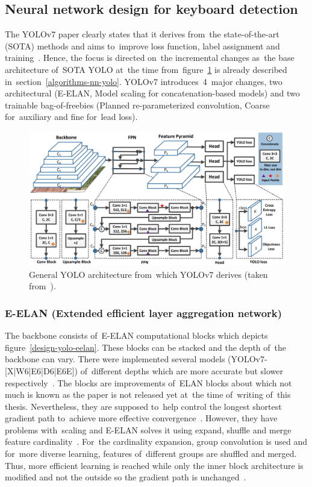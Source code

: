\subsection{Neural network design for keyboard detection}
\label{design-keyboard-neural-network}
The YOLOv7 paper clearly states that it derives from~the state-of-the-art (SOTA) \hbox{methods} and aims to~improve loss function, label assignment and training~\cite{yolov7}. Hence, the focus is directed on~the incremental changes as~the base architecture of~SOTA YOLO at~the time from~figure~\ref{design-yolo-architecture} is already described in~section~\ref{algorithms-nn-yolo}. YOLOv7 introduces~4~\hbox{major} changes, two architectural (E-ELAN, Model scaling for concatenation-based \hbox{models}) and two trainable bag-of-freebies (Planned re-parameterized convolution, Coarse for~\hbox{auxiliary} and fine for~lead loss).

\begin{figure}[hbt]
    \includegraphics[width=1\textwidth]{img/design/yolov7-architecture.png}
    \caption{General YOLO architecture from~which YOLOv7 derives (taken from~\cite{pp-yolo}).}
    \label{design-yolo-architecture}
\end{figure}

\subsubsection{E-ELAN (Extended efficient layer aggregation network)}
The backbone consists of~E-ELAN computational blocks which depicts figure~\ref{design-yolo-eelan}. These blocks can be stacked and the depth of~the backbone can vary. There were implemented several models (YOLOv7-[X|W6|E6|D6|E6E]) of~different depths which are more accurate but slower respectively~\cite{yolov7}. The blocks are improvements of~ELAN blocks about which not much is known as the paper is not released yet at~the time of~writing of~this thesis. Nevertheless, they are supposed to~help control the longest shortest gradient path to~achieve more effective convergence~\cite{yolov7}. However, they have problems with~scaling and E-ELAN solves it using expand, shuffle and merge feature cardinality~\cite{yolov7}. For~the cardinality expansion, group convolution is used and for~more diverse learning, features of~different groups are shuffled and merged. Thus, more efficient learning is reached while only the inner block architecture is modified and not the outside so the gradient path is unchanged~\cite{yolov7}.

